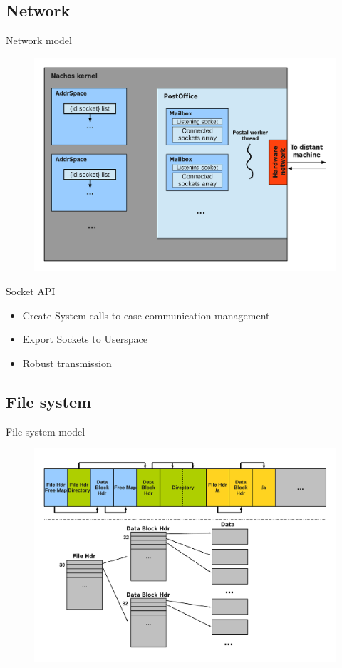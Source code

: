 \documentclass{beamer}
\begin{document}
\subsection{Network}
\begin{frame}{Network model}
    \begin{figure}[ht]
        \includegraphics[width=0.9\linewidth]{Networkcolored.pdf}
    \end{figure}
\end{frame}

\begin{frame}{Socket API}
    \begin{itemize}
        \item Create System calls to ease communication management
        \item Export Sockets to Userspace
        \item Robust transmission
    \end{itemize}
\end{frame}

\subsection{File system}
\begin{frame}{File system model}
    \begin{figure}[ht]
        \includegraphics[width=0.9\linewidth]{filesystem.pdf}
    \end{figure}
\end{frame}
\end{document}
